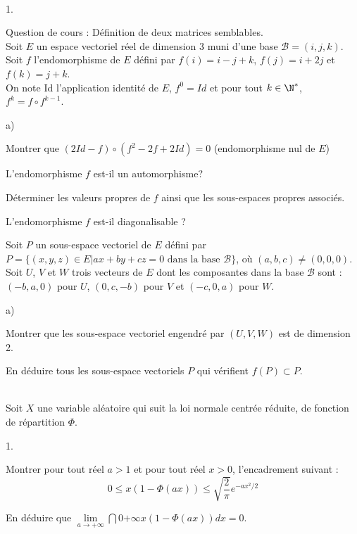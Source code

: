 \documentclass[11pt]{article}%
\begin{document}
\begin{exerciceAP}~
  \begin{noliste}{1.}
    \setlength{\itemsep}{2mm}
  \item Question de cours : Définition de deux matrices semblables.\\
    Soit $E$ un espace vectoriel réel de dimension 3 muni d'une base
    $\mathcal{B}=(i,j,k)$. Soit $f$ l'endomorphisme de $E$ défini par
    $f(i)= i-j+k$, $f(j)=i+2j$ et $f(k)= j+k$.\\ 
    On note Id l'application identité de $E$, $f^0=Id$ et pour tout $k
    \in \N^*$, $f^k= f \circ f^{k-1}$.
  \item 
    \begin{noliste}{a)}
    \setlength{\itemsep}{2mm}
    \item Montrer que $(2 Id-f) \circ (f^2-2f+2Id)=0$ (endomorphisme
      nul de $E$)
    \item L'endomorphisme $f$ est-il un automorphisme? 
    \item Déterminer les valeurs propres de $f$ ainsi que les
      sous-espaces propres associés.
    \item L'endomorphisme $f$ est-il diagonalisable ?  
    \end{noliste}

  \item Soit $P$ un sous-espace vectoriel de $E$ défini par $P=
    \{(x,y,z) \in E | ax+by+cz=0 \text{ dans la base } \mathcal{B}\}$,
    où $(a,b,c) \neq (0,0,0)$.\\
    Soit $U$, $V$ et $W$ trois vecteurs de $E$ dont les composantes
    dans la base $\mathcal{B}$ sont : $(-b,a,0)$ pour $U$, $(0,c,-b)$
    pour $V$ et $(-c,0,a)$ pour $W$.
    \begin{noliste}{a)}
    \setlength{\itemsep}{2mm}
    \item Montrer que les sous-espace vectoriel engendré par $(U,V,W)$
      est de dimension 2. 
    \item En déduire tous les sous-espace vectoriels $P$ qui vérifient
      $f(P) \subset P$. 
    \end{noliste}
  \end{noliste}
\end{exerciceAP}


\begin{exerciceSP}~\\
  Soit $X$ une variable aléatoire qui suit la loi normale centrée
  réduite, de fonction de répartition $\Phi$.
  \begin{noliste}{1.}
    \setlength{\itemsep}{2mm}
  \item Montrer pour tout réel $a >1$ et pour tout réel $x>0$,
    l'encadrement suivant :
    \[
    0 \leq x(1 - \Phi(ax)) \leq \sqrt{\frac{2}{\pi}}e^{-ax^2/2}
    \]
  \item En déduire que $\lim \limits_{a \to +\infty} \dint{0}{+\infty}
    x(1-\Phi(ax))dx=0$.
  \end{noliste}
\end{exerciceSP}
\end{document}
